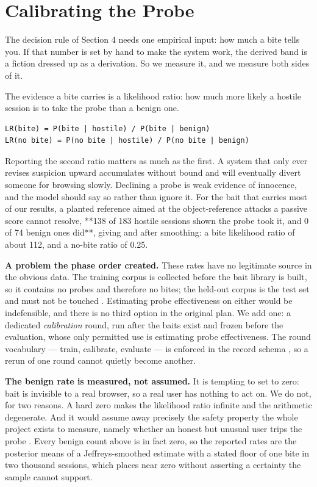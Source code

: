 
\section{Calibrating the Probe}

The decision rule of Section 4 needs one empirical input: how much a bite tells
you. If that number is set by hand to make the system work, the derived band is a
fiction dressed up as a derivation. So we measure it, and we measure both sides of
it.

The evidence a bite carries is a likelihood ratio: how much more likely a hostile
session is to take the probe than a benign one.

\begin{lstlisting}
LR(bite) = P(bite | hostile) / P(bite | benign)
LR(no bite) = P(no bite | hostile) / P(no bite | benign)
\end{lstlisting}


Reporting the second ratio matters as much as the first. A system that only ever
revises suspicion upward accumulates without bound and will eventually divert
someone for browsing slowly. Declining a probe is weak evidence of innocence, and
the model should say so rather than ignore it. For the bait that carries most of
our results, a planted  reference aimed at the object-reference
attacks a passive score cannot resolve, **138 of 183 hostile sessions shown the
probe took it, and 0 of 74 benign ones did**, giving  and
 after smoothing: a bite likelihood ratio of about 112, and a
no-bite ratio of 0.25.

\textbf{A problem the phase order created.} These rates have no legitimate source in
the obvious data. The training corpus is collected before the bait library is
built, so it contains no probes and therefore no bites; the held-out corpus is the
test set and must not be touched \cite{arp2022dos}. Estimating probe effectiveness on either would
be indefensible, and there is no third option in the original plan. We add one: a
dedicated \emph{calibration} round, run after the baits exist and frozen before the
evaluation, whose only permitted use is estimating probe effectiveness. The round
vocabulary --- train, calibrate, evaluate --- is enforced in the record schema \cite{sommer2010outside}, so a
rerun of one round cannot quietly become another.

\textbf{The benign rate is measured, not assumed.} It is tempting to set  to
zero: bait is invisible to a real browser, so a real user has nothing to act on. We
do not, for two reasons. A hard zero makes the likelihood ratio infinite and the
arithmetic degenerate. And it would assume away precisely the safety property the
whole project exists to measure, namely whether an honest but unusual user trips the
probe \cite{srinivasa2020honeytoken}. Every benign count above is in fact zero, so the reported rates are the
posterior means of a Jeffreys-smoothed estimate with a stated floor of one bite in
two thousand sessions, which places  near zero without asserting a
certainty the sample cannot support.

